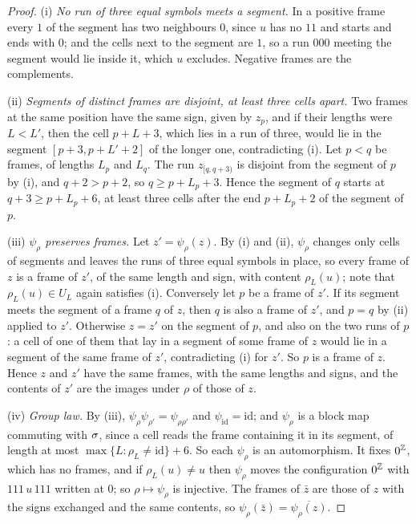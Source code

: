 \begin{proof}
(i) \emph{No run of three equal symbols meets a segment.} In a positive frame every $1$ of the segment has two neighbours $0$, since $u$ has no $11$ and starts and ends with $0$; and the cells next to the segment are $1$, so a run $000$ meeting the segment would lie inside it, which $u$ excludes. Negative frames are the complements.

(ii) \emph{Segments of distinct frames are disjoint, at least three cells apart.} Two frames at the same position have the same sign, given by $z_p$, and if their lengths were $L<L'$, then the cell $p+L+3$, which lies in a run of three, would lie in the segment $[p+3,p+L'+2]$ of the longer one, contradicting (i). Let $p<q$ be frames, of lengths $L_p$ and $L_q$. The run $z_{[q,q+3)}$ is disjoint from the segment of $p$ by (i), and $q+2>p+2$, so $q\ge p+L_p+3$. Hence the segment of $q$ starts at $q+3\ge p+L_p+6$, at least three cells after the end $p+L_p+2$ of the segment of $p$.

(iii) \emph{$\psi_\rho$ preserves frames.} Let $z'=\psi_\rho(z)$. By (i) and (ii), $\psi_\rho$ changes only cells of segments and leaves the runs of three equal symbols in place, so every frame of $z$ is a frame of $z'$, of the same length and sign, with content $\rho_L(u)$; note that $\rho_L(u)\in U_L$ again satisfies (i). Conversely let $p$ be a frame of $z'$. If its segment meets the segment of a frame $q$ of $z$, then $q$ is also a frame of $z'$, and $p=q$ by (ii) applied to $z'$. Otherwise $z=z'$ on the segment of $p$, and also on the two runs of $p$: a cell of one of them that lay in a segment of some frame of $z$ would lie in a segment of the same frame of $z'$, contradicting (i) for $z'$. So $p$ is a frame of $z$. Hence $z$ and $z'$ have the same frames, with the same lengths and signs, and the contents of $z'$ are the images under $\rho$ of those of $z$.

(iv) \emph{Group law.} By (iii), $\psi_\rho\psi_{\rho'}=\psi_{\rho\rho'}$ and $\psi_{\mathrm{id}}=\mathrm{id}$; and $\psi_\rho$ is a block map commuting with $\sigma$, since a cell reads the frame containing it in its segment, of length at most $\max\{L:\rho_L\ne\mathrm{id}\}+6$. So each $\psi_\rho$ is an automorphism. It fixes $0^{\mathbb{Z}}$, which has no frames, and if $\rho_L(u)\ne u$ then $\psi_\rho$ moves the configuration $0^{\mathbb{Z}}$ with $111\,u\,111$ written at $0$; so $\rho\mapsto\psi_\rho$ is injective. The frames of $\bar z$ are those of $z$ with the signs exchanged and the same contents, so $\psi_\rho(\bar z)=\overline{\psi_\rho(z)}$.


\end{proof}
